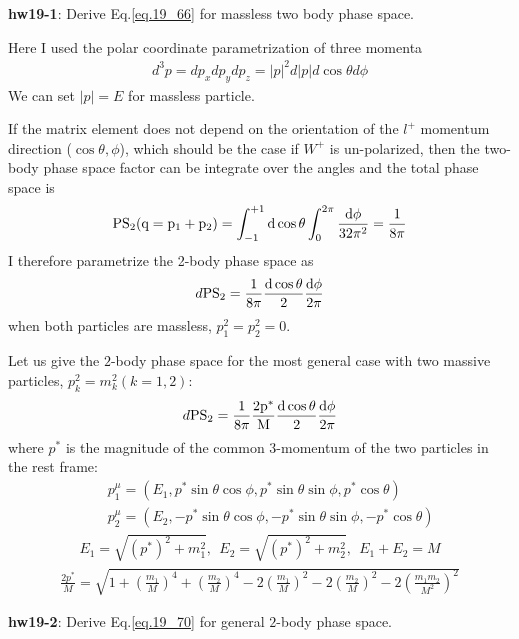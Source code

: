 \documentclass[12pt]{article}
\def\PS{\rm PS}
\begin{document}
{\bf hw19-1}: Derive Eq.\ref{eq.19_66} for massless two body phase space.

Here I used the polar coordinate parametrization of three momenta
\begin{eqnarray}
  d^3 p = dp_x dp_y dp_z
          = |p|^2 d|p| d\cos\theta d\phi \label{eq.19_67}
\end{eqnarray}
We can set $|p|=E$ for massless particle.

If the matrix element does not depend on the orientation of the
$l^+$ momentum direction ($\cos\theta, \phi$), which should be the case
if $W^+$ is un-polarized, then the two-body phase space factor can be
integrate over the angles and the total phase space is
\begin{eqnarray}
  \PS_2(q=p_1+p_2)
= \int_{-1}^{+1} d\cos\theta \int_0^{2\pi} \frac{d\phi}{32\pi^2}
= \frac{1}{8\pi} \label{eq.19_68}
\end{eqnarray}
I therefore parametrize the 2-body phase space as
\begin{eqnarray}
  d\PS_2 = \frac{1}{8\pi} \frac{d\cos\theta}{2} \frac{d\phi}{2\pi} \label{eq.19_69}
\end{eqnarray}
when both particles are massless, $p_1^2=p_2^2=0$.

Let us give the $2$-body phase space for the most general case with two
massive particles, $p_k^2=m_k^2 (k=1,2)$:
\begin{eqnarray}
  d\PS_2 = \frac{1}{8\pi} \frac{2p^*}{M} \frac{ d\cos\theta}{2} \frac{d\phi}{2\pi} \label{eq.19_70}
\end{eqnarray}
where $p^*$ is the magnitude of the common $3$-momentum of the two
particles in the rest frame:
\begin{eqnarray}\label{eq.19_71a}
  &&p_1^\mu = (E_1, p^* \sin\theta\cos\phi, p^* \sin\theta\sin\phi, p^* \cos\theta) \nonumber \\
  &&p_2^\mu = (E_2,-p^* \sin\theta\cos\phi, -p^* \sin\theta\sin\phi, -p^* \cos\theta)
\end{eqnarray}
\begin{eqnarray}
  E_1 = \sqrt{ (p^*)^2 + m_1^2 },~~
  E_2 = \sqrt{ (p^*)^2 + m_2^2 },~~
  E_1+E_2 = M \label{eq.19_71b}
\end{eqnarray}
\begin{eqnarray}
  \frac{2p^*}{M}
   = \sqrt{1+(\frac{m_1}{M})^4+(\frac{m_2}{M})^4-2(\frac{m_1}{M})^2-2(\frac{m_2}{M})^2-2(\frac{m_1m_2}{M^2})^2}\label{eq.19_71c}
\end{eqnarray}

{\bf hw19-2}: Derive Eq.\ref{eq.19_70} for general $2$-body phase space.
\end{document}
